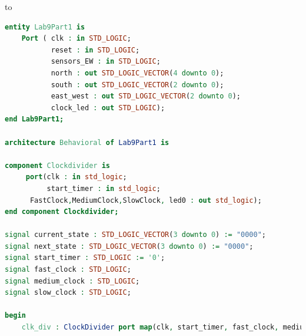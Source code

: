 to\documentclass[11pt]{article}
\begin{document}
\begin{appendices}
\begin{lstlisting}[language=VHDL]
entity Lab9Part1 is
    Port ( clk : in STD_LOGIC;
           reset : in STD_LOGIC;
           sensors_EW : in STD_LOGIC;
           north : out STD_LOGIC_VECTOR(4 downto 0);
           south : out STD_LOGIC_VECTOR(2 downto 0);
           east_west : out STD_LOGIC_VECTOR(2 downto 0);
           clock_led : out STD_LOGIC);
end Lab9Part1;

architecture Behavioral of Lab9Part1 is

component Clockdivider is
     port(clk : in std_logic;
          start_timer : in std_logic;
	  FastClock,MediumClock,SlowClock, led0 : out std_logic);
end component Clockdivider;

signal current_state : STD_LOGIC_VECTOR(3 downto 0) := "0000";
signal next_state : STD_LOGIC_VECTOR(3 downto 0) := "0000";
signal start_timer : STD_LOGIC := '0';
signal fast_clock : STD_LOGIC;
signal medium_clock : STD_LOGIC;
signal slow_clock : STD_LOGIC;

begin
    clk_div : ClockDivider port map(clk, start_timer, fast_clock, medium_clock, slow_clock, clock_led);
    

\end{lstlisting}
\end{appendices}
\end{document}

